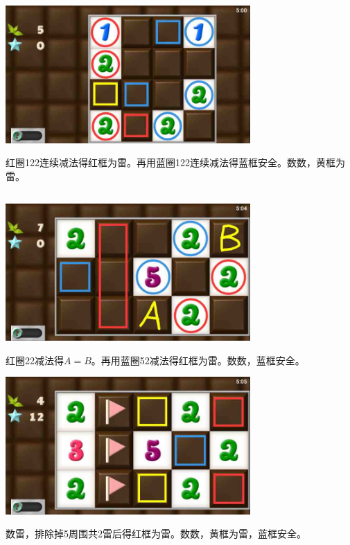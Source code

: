 \subsection{} %
\begin{center}
    \includegraphics[width=0.7\textwidth]{puzzlelow/57-1.jpg}
\end{center}
红圈122连续减法得红框为雷。再用蓝圈122连续减法得蓝框安全。数数，黄框为雷。

\subsection{} %
\begin{center}
    \includegraphics[width=0.7\textwidth]{puzzlelow/58-1.jpg}
\end{center}
红圈22减法得$A=B$。再用蓝圈52减法得红框为雷。数数，蓝框安全。
\begin{center}
    \includegraphics[width=0.7\textwidth]{puzzlelow/58-2.jpg}
\end{center}
数雷，排除掉5周围共2雷后得红框为雷。数数，黄框为雷，蓝框安全。

